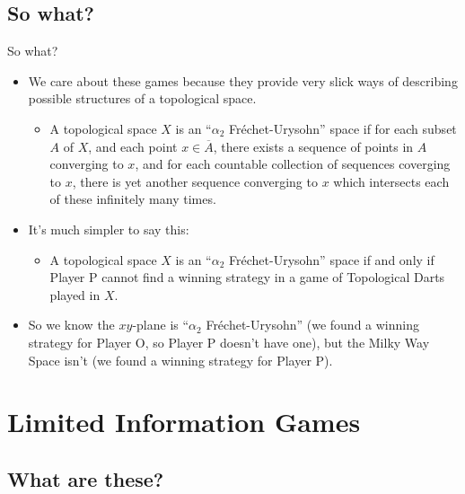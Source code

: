 \documentclass{beamer}
\begin{document}
\subsection{So what?}

\begin{frame}{So what?}
  \begin{itemize}
    \item
      We care about these games because they provide very slick ways of describing possible structures of a topological space.
    \pause
      \begin{itemize}
        \item
          A topological space $X$ is an ``$\alpha_2$ Fr\'echet-Urysohn'' space if for each subset $A$ of $X$, and each point $x \in \overline{A}$, there exists a sequence of points in $A$ converging to $x$, and for each countable collection of sequences coverging to $x$, there is yet another sequence converging to $x$ which intersects each of these infinitely many times.
      \end{itemize}
  \end{itemize}
\end{frame}

\begin{frame}
  \begin{itemize}
    \item
      It's much simpler to say this:
    \pause
      \begin{itemize}
        \item
          A topological space $X$ is an ``$\alpha_2$ Fr\'echet-Urysohn'' space if and only if Player P cannot find a winning strategy in a game of Topological Darts played in $X$.
      \end{itemize}
    \pause
    \item
      So we know the $xy$-plane is ``$\alpha_2$ Fr\'echet-Urysohn'' (we found a winning strategy for Player O, so Player P doesn't have one), but the Milky Way Space isn't (we found a winning strategy for Player P).
  \end{itemize}
\end{frame}

\section{Limited Information Games}

\subsection{What are these?}
\end{document}
